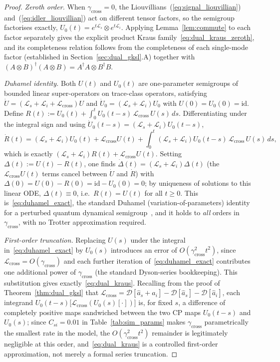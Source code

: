 \documentclass[journal]{IEEEtran}
\begin{document}
\begin{proof}
\emph{Zeroth order.} When $\gamma_{\text{cross}}=0$, the Liouvillians~(\ref{eq:signal_liouvillian}) and~(\ref{eq:idler_liouvillian}) act on different tensor factors, so the semigroup factorises exactly, $U_0(t)=e^{t\mathcal L_s}\otimes e^{t\mathcal L_i}$. Applying Lemma~\ref{lem:commute} to each factor separately gives the explicit product Kraus family~\eqref{eq:dual_kraus_zeroth}, and its completeness relation follows from the completeness of each single-mode factor (established in Section~\ref{sec:dual_gksl}.A) together with $(A\otimes B)^\dagger(A\otimes B)=A^\dagger A\otimes B^\dagger B$.

\emph{Duhamel identity.} Both $U(t)$ and $U_0(t)$ are one-parameter semigroups of bounded linear super-operators on trace-class operators, satisfying $\dot U=(\mathcal L_s+\mathcal L_i+\mathcal L_{\text{cross}})U$ and $\dot U_0=(\mathcal L_s+\mathcal L_i)U_0$ with $U(0)=U_0(0)=\mathrm{id}$. Define $R(t):=U_0(t)+\int_0^t U_0(t-s)\,\mathcal L_{\text{cross}}\,U(s)\,ds$. Differentiating under the integral sign and using $\dot U_0(t-s)=(\mathcal L_s+\mathcal L_i)U_0(t-s)$,
\[
\dot R(t) = (\mathcal L_s+\mathcal L_i)U_0(t) + \mathcal L_{\text{cross}}U(t) + \int_0^t(\mathcal L_s+\mathcal L_i)U_0(t-s)\,\mathcal L_{\text{cross}}\,U(s)\,ds,
\]
which is exactly $(\mathcal L_s+\mathcal L_i)R(t)+\mathcal L_{\text{cross}}U(t)$. Setting $\Delta(t):=U(t)-R(t)$, one finds $\dot\Delta(t)=(\mathcal L_s+\mathcal L_i)\Delta(t)$ (the $\mathcal L_{\text{cross}}U(t)$ terms cancel between $\dot U$ and $\dot R$) with $\Delta(0)=U(0)-R(0)=\mathrm{id}-U_0(0)=0$; by uniqueness of solutions to this linear ODE, $\Delta(t)\equiv0$, i.e.\ $R(t)=U(t)$ for all $t\geq0$. This is~\eqref{eq:duhamel_exact}, the standard Duhamel (variation-of-parameters) identity for a perturbed quantum dynamical semigroup~\cite[Sec.~8.2]{breuer2002theory}, and it holds to \emph{all} orders in $\gamma_{\text{cross}}$, with no Trotter approximation required.

\emph{First-order truncation.} Replacing $U(s)$ under the integral in~\eqref{eq:duhamel_exact} by $U_0(s)$ introduces an error of $O(\gamma_{\text{cross}}^2t^2)$, since $\mathcal L_{\text{cross}}=O(\gamma_{\text{cross}})$ and each further iteration of~\eqref{eq:duhamel_exact} contributes one additional power of $\gamma_{\text{cross}}$ (the standard Dyson-series bookkeeping). This substitution gives exactly~\eqref{eq:dual_kraus}. Recalling from the proof of Theorem~\ref{thm:dual_gksl} that $\mathcal L_{\text{cross}}=\mathcal D[\hat a_s+\hat a_i]-\mathcal D[\hat a_s]-\mathcal D[\hat a_i]$, each integrand $U_0(t-s)\big[\mathcal L_{\text{cross}}(U_0(s)[\cdot])\big]$ is, for fixed $s$, a difference of completely positive maps sandwiched between the two CP maps $U_0(t-s)$ and $U_0(s)$; since $C_{si}=0.01$ in Table~\ref{tab:sim_params} makes $\gamma_{\text{cross}}$ parametrically the smallest rate in the model, the $O(\gamma_{\text{cross}}^2t^2)$ remainder is legitimately negligible at this order, and~\eqref{eq:dual_kraus} is a controlled first-order approximation, not merely a formal series truncation.
\end{proof}
\end{document}
